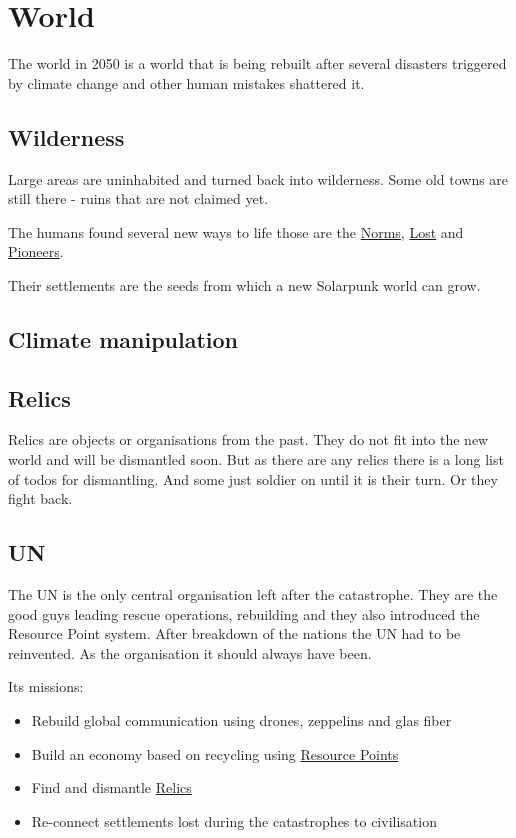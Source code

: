 \chapter{World}

The world in 2050 is a world that is being rebuilt after several disasters triggered by climate change and other human mistakes shattered it.

\section{Wilderness}

Large areas are uninhabited and turned back into wilderness. Some old towns are still there - ruins that are not claimed yet.

The humans found several new ways to life those are the \hyperref[sec: Norms]{Norms}, \hyperref[sec: Lost]{Lost} and \hyperref[sec: Pioneers]{Pioneers}.

Their settlements are the seeds from which a new Solarpunk world can grow.

\section{Climate manipulation}

\section{Relics}
\label{sec: Relic}
Relics are objects or organisations from the past. They do not fit into the new world and will be dismantled soon. But as there are any relics there is a long list of todos for dismantling. And some just soldier on until it is their turn. Or they fight back.

\section{UN}
\label{sec: UN}

The UN is the only central organisation left after the catastrophe. They are the good guys leading rescue operations, rebuilding and they also introduced the Resource Point system. After breakdown of the nations the UN had to be reinvented. As the organisation it should always have been.

Its missions:

\begin{itemize}
    \item Rebuild global communication using drones, zeppelins and glas fiber
    \item Build an economy based on recycling using \hyperref[sec:Resource Points]{Resource Points}
    \item Find and dismantle \hyperref[sec: Relic]{Relics}
    \item Re-connect settlements lost during the catastrophes to civilisation
\end{itemize}

